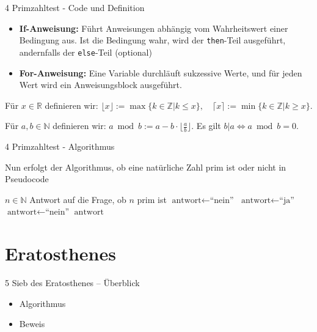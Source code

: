 \documentclass{beamer}
\newcommand{\Z}{\mathbb{Z}}%
\newcommand{\N}{\mathbb{N}}%
\newcommand{\R}{\mathbb{R}}%
\begin{document}
\begin{frame}{4 Primzahltest - Code und Definition}
    
    \begin{itemize}
        \item \textbf{If-Anweisung:} Führt Anweisungen abhängig vom Wahrheitswert einer Bedingung aus. Ist die Bedingung wahr, wird der \texttt{then}-Teil ausgeführt, andernfalls der \texttt{else}-Teil (optional)
        \item \textbf{For-Anweisung:} Eine Variable durchläuft sukzessive Werte, und für jeden Wert wird ein Anweisungsblock ausgeführt.
    \end{itemize}

\begin{definition} [Gaußklammern]
Für \(
x \in \R
\) definieren wir:
\(
\lfloor x \rfloor := \max\{k \in \Z | k \leq x \}, \quad
\lceil x \rceil := \min \{k \in \Z | k \geq x \}.
\)
\end{definition}

\begin{definition}
Für $a,b \in \N$ definieren wir:
\(
a \bmod b := a - b \cdot \lfloor \frac{a}{b} \rfloor .
\)
Es gilt
\(
b | a \iff a \bmod b = 0.
\)
    
\end{definition}
\end{frame}

\begin{frame}{4 Primzahltest - Algorithmus}
   
   Nun erfolgt der Algorithmus, ob eine natürliche Zahl prim ist oder nicht in Pseudocode
   
\begin{algorithm}[H]
\begin{algorithmic}[1]
\Require $n \in \mathbb{N}$
\Ensure Antwort auf die Frage, ob $n$ prim ist
    \State $\text{antwort} \gets \text{``nein''}$
\Else
    \State $\text{antwort} \gets \text{``ja''}$
            \State $\text{antwort} \gets \text{``nein''}$
        \EndIf
    \EndFor
\EndIf
\State \Return $\text{antwort}$
\end{algorithmic}
\end{algorithm}

\end{frame}


\section{Eratosthenes}
\begin{frame}{5 Sieb des Eratosthenes – Überblick}
\begin{itemize}
   \item Algorithmus
    \item Beweis
\end{itemize}
\end{frame}
\end{document}
